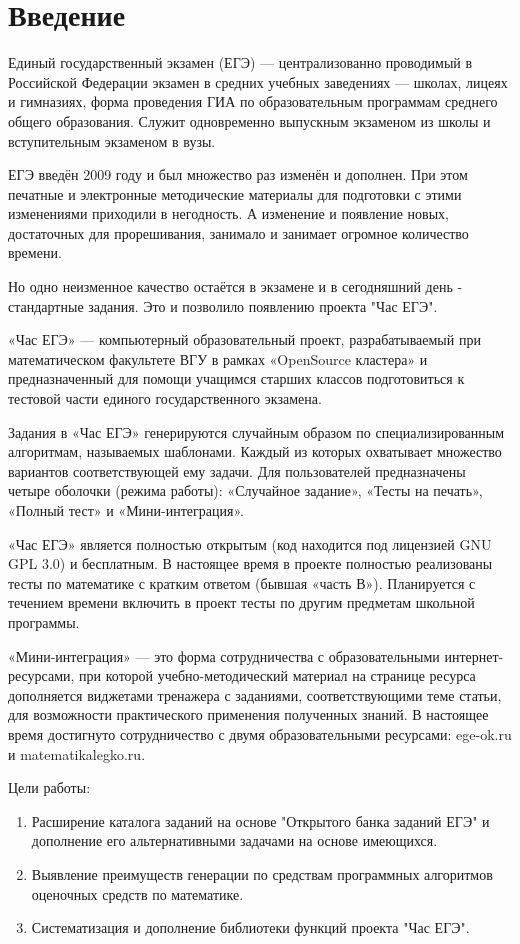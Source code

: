 
\section{Введение}%
Единый государственный экзамен (ЕГЭ) --- централизованно проводимый в Российской Федерации экзамен в средних учебных заведениях — школах, лицеях и гимназиях,
форма проведения ГИА по образовательным программам среднего общего образования.
Служит одновременно выпускным экзаменом из школы и вступительным экзаменом в вузы.

ЕГЭ введён 2009 году и был множество раз изменён и дополнен. 
При этом печатные и электронные методические материалы для подготовки с этими изменениями приходили в негодность. А изменение и появление новых, достаточных для прорешивания, занимало и занимает огромное количество времени. 

Но одно неизменное качество остаётся в экзамене и в сегодняшний день - стандартные задания. 
Это и позволило появлению проекта "Час ЕГЭ".

«Час ЕГЭ» — компьютерный образовательный проект, разрабатываемый при математическом факультете ВГУ в рамках «OpenSource кластера» и предназначенный для помощи учащимся старших классов подготовиться к тестовой части единого государственного экзамена.

Задания в «Час ЕГЭ» генерируются случайным образом по специализированным алгоритмам, называемых шаблонами.
Каждый из которых охватывает множество вариантов соответствующей ему задачи. Для пользователей предназначены четыре оболочки (режима работы): «Случайное задание», «Тесты на печать», «Полный тест» и «Мини-интеграция».

«Час ЕГЭ» является полностью открытым (код находится под лицензией GNU GPL 3.0) и бесплатным.
В настоящее время в проекте полностью реализованы тесты по математике с кратким ответом (бывшая «часть В»).
Планируется с течением времени включить в проект тесты по другим предметам школьной программы.

«Мини-интеграция» — это форма сотрудничества с образовательными интернет-ресурсами, при которой учебно-методический материал на странице ресурса дополняется виджетами тренажера с заданиями, соответствующими теме статьи, для возможности практического применения полученных знаний.
В настоящее время достигнуто сотрудничество с двумя образовательными ресурсами: ege-ok.ru и matematikalegko.ru.

Цели работы:
\begin{enumerate}
    \item Расширение каталога заданий на основе "Открытого банка заданий ЕГЭ" и дополнение его альтернативными задачами на основе имеющихся.
    \item Выявление преимуществ генерации по средствам программных алгоритмов оценочных средств по математике.
    \item Систематизация и дополнение библиотеки функций проекта "Час ЕГЭ".
\end{enumerate}
